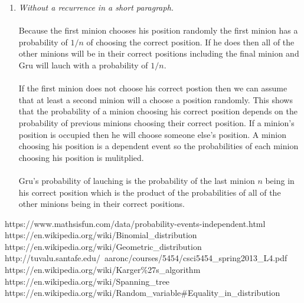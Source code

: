 \documentclass[12pt]{article}
\begin{document}
\begin{enumerate}
\begin{enumerate}
			\item \textit{Without a recurrence in a short paragraph.}\\
			\\
			Because the first minion chooses his position randomly the first minion has a probability of $1/n$ of choosing the correct position.  If he does then all of the other minions will be in their correct positions including the final minion and Gru will lauch with a probability of $1/n$.\\
			\\
			If the first minion does not choose his correct postion then we can assume that at least a second minion will a choose a position randomly.  This shows that the probability of a minion choosing his correct position depends on the probability of previous minions choosing their correct position.  If a minion's position is occupied then he will choose someone else's position.  A minion choosing his position is a dependent event so the probabilities of each minion choosing his position is mulitplied.\\
			\\
			Gru's probability of lauching is the probability of the last minion $n$ being in his correct position which is the product of the probabilities of all of the other minions being in their correct positions.
		\end{enumerate}

\end{enumerate}

\newpage
\begin{thebibliography}{10}
	 https://www.mathsisfun.com/data/probability-events-independent.html
	 https://en.wikipedia.org/wiki/Binomial\_distribution
	 https://en.wikipedia.org/wiki/Geometric\_distribution
     http://tuvalu.santafe.edu/~aaronc/courses/5454/csci5454\_spring2013\_L4.pdf
     https://en.wikipedia.org/wiki/Karger\%27s\_algorithm
     https://en.wikipedia.org/wiki/Spanning\_tree
     https://en.wikipedia.org/wiki/Random\_variable\#Equality\_in\_distribution
\end{thebibliography}
\end{document}
